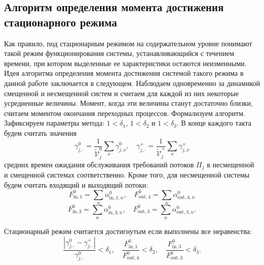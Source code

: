\documentclass[a4paper,12pt,russian]{extarticle}
\begin{document}
\subsection{Алгоритм определения момента достижения стационарного режима}
Как правило, под стационарным режимом на содержательном уровне понимают такой режим функционирования системы, устанавливающийся с течением времени, при котором выделенные ее характеристики остаются неизменными. Идея алгоритма определения момента достижения системой такого режима в данной работе заключается в следующем. Наблюдаем одновременно за динамикой смещенной и несмещенной систем и считаем для каждой из них некоторые усредненные величины. Момент, когда эти величины станут достаточно близки, считаем моментом окончания переходных процессов. Формализуем алгоритм. Зафиксируем параметры метода:  $1 < \delta_1$, $1 < \delta_2$ и $1 < \delta_3$. В конце каждого такта будем считать значения 
\begin{equation}
   \gamma_{j,\cdot}^0 = \frac{1}{\tilde{\mathcal{V}}_j^0}\sum_{\nu} \gamma_{j,\nu}^0, \quad \gamma_{j,\cdot}^+ = \frac{1}{\tilde{\mathcal{V}}_j^+}\sum_{\nu} \gamma_{j,\nu}^+ 
\end{equation}
средних времен ожидания обслуживания требований потоков $\Pi_j$ в несмещенной и смещенной системах соответственно. Кроме того, для несмещенной системы будем считать входящий и выходящий потоки:
\begin{equation}
    F^{0}_{\text{in},1} = \sum_n \alpha^{0}_{\text{in},1,n}, \quad 
    F^{0}_{\text{out},4} = \sum_n \alpha^{0}_{\text{out},4,n}
\end{equation}
\begin{equation}
    F^{0}_{\text{in},3} = \sum_n \alpha^{0}_{\text{in},3,n}, \quad 
    F^{0}_{\text{out},3} = \sum_n \alpha^{0}_{\text{out},3,n}.
\end{equation}


Стационарный режим считается достигнутым если выполнены все неравенства:
\begin{equation}
    \frac{|\gamma_{j,\cdot}^0 - \gamma_{j,\cdot}^+|}{\gamma_{j,\cdot}^0} < \delta_1, \quad
    \frac{F^{0}_{\text{in},1}}{F^{0}_{\text{out},4}} < \delta_2, \quad 
    \frac{F^{0}_{\text{in},3}}{F^{0}_{\text{out},3}} < \delta_3.
\end{equation}
\end{document}
